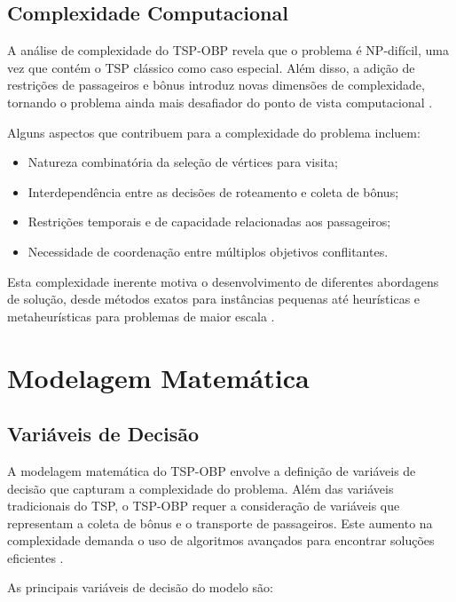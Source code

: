\documentclass[12pt, a4paper]{report}
\begin{document}
\section{Complexidade Computacional}
A análise de complexidade do TSP-OBP revela que o problema é NP-difícil, uma vez que contém o TSP clássico como caso especial. Além disso, a adição de restrições de passageiros e bônus introduz novas dimensões de complexidade, tornando o problema ainda mais desafiador do ponto de vista computacional \cite{carvalho2022}.

Alguns aspectos que contribuem para a complexidade do problema incluem:

\begin{itemize}
    \item Natureza combinatória da seleção de vértices para visita;
    \item Interdependência entre as decisões de roteamento e coleta de bônus;
    \item Restrições temporais e de capacidade relacionadas aos passageiros;
    \item Necessidade de coordenação entre múltiplos objetivos conflitantes.
\end{itemize}

Esta complexidade inerente motiva o desenvolvimento de diferentes abordagens de solução, desde métodos exatos para instâncias pequenas até heurísticas e metaheurísticas para problemas de maior escala \cite{gomes2016}.

\chapter{Modelagem Matemática}

\section{Variáveis de Decisão}
A modelagem matemática do TSP-OBP envolve a definição de variáveis de decisão que capturam a complexidade do problema. Além das variáveis tradicionais do TSP, o TSP-OBP requer a consideração de variáveis que representam a coleta de bônus e o transporte de passageiros. Este aumento na complexidade demanda o uso de algoritmos avançados para encontrar soluções eficientes \cite{carvalho2022}.

As principais variáveis de decisão do modelo são:
\end{document}
